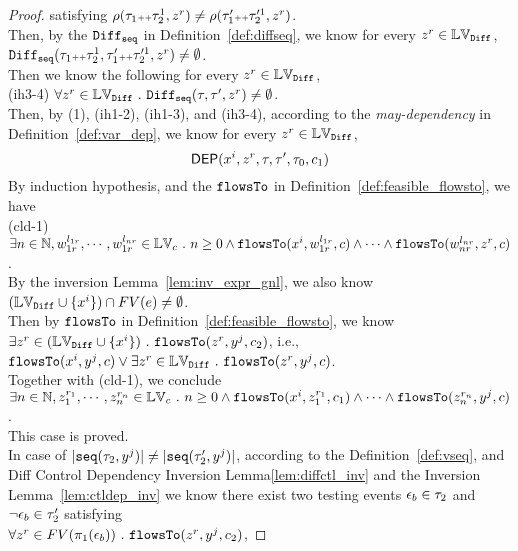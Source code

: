 \begin{proof}
satisfying $\rho(\mathtt{\tau}_1 {\scriptscriptstyle ++} \mathtt{\tau}_2^1, z^r) \neq \rho(\mathtt{\tau}_1'{\scriptscriptstyle ++} \mathtt{\tau}'^1_2, z^r) $.
\\
Then, by the $\mathtt{Diff}_{\mathtt{seq}}$ in Definition~\ref{def:diffseq}, we know for every $z^r \in \mathbb{LV}_{\mathtt{Diff}}$,
$\mathtt{Diff}_{\mathtt{seq}}(\mathtt{\tau}_1 {\scriptscriptstyle ++} \mathtt{\tau}_2^1, \mathtt{\tau}_1'{\scriptscriptstyle ++} \mathtt{\tau}'^1_2, z^r) \neq \emptyset$. 
\\
Then we know the following for every $z^r \in \mathbb{LV}_{\mathtt{Diff}}$,
\\
(ih3-4) $\forall z^r \in \mathbb{LV}_{\mathtt{Diff}} ~.~ \mathtt{Diff}_{\mathtt{seq}}(\mathtt{\tau}, \mathtt{\tau}', z^r) \neq \emptyset$.
\\
Then, by (1), (ih1-2), (ih1-3), and (ih3-4),  according to the \emph{may-dependency} in Definition~\ref{def:var_dep}, we know for every $z^r \in \mathbb{LV}_{\mathtt{Diff}}$,
\[
  \mathsf{DEP}(x^i, z^r, \mathtt{\tau}, \mathtt{\tau}', \mathtt{\tau}_0, c_1)
\]
By induction hypothesis, and the $\mathtt{flowsTo}$ in Definition~\ref{def:feasible_flowsto}, we have 
\\
(cld-1) 
$\exists n \in \mathbb{N}, w_{1r}^{l_{1r}}, \cdots, w_{1r}^{l_{nr}} \in \mathbb{LV}_{{c}} ~.~ n \geq 0 \land
\mathtt{flowsTo}(x^i,  w_{1r}^{l_{1r}}, c) 
\land \cdots \land \mathtt{flowsTo}(w_{nr}^{l_{nr}}, z^r, c)$.
\\
By the inversion Lemma~\ref{lem:inv_expr_gnl}, we also know 
$(\mathbb{LV}_{\mathtt{Diff}} \cup \{x^i\} )\cap FV(e) \neq \emptyset$.
\\
Then by $\mathtt{flowsTo}$ in Definition~\ref{def:feasible_flowsto}, 
we know 
$ \exists z^r \in (\mathbb{LV}_{\mathtt{Diff}} \cup \{x^i\} ) ~.~ \mathtt{flowsTo}(z^r, y^j, c_2)$, i.e., 
\\
$\mathtt{flowsTo}(x^i, y^j, c) \lor 
\exists z^r \in \mathbb{LV}_{\mathtt{Diff}} ~.~ \mathtt{flowsTo}(z^r, y^j, c)$.
\\
Together with (cld-1), we conclude 
\\
$\exists n \in \mathbb{N}, z_1^{r_1}, \cdots, z_n^{r_n} \in \mathbb{LV}_{{c}} ~.~ n \geq 0 \land
\mathtt{flowsTo}(x^i,  z_1^{r_1}, c_1) 
\land \cdots \land \mathtt{flowsTo}(z_n^{r_n}, y^j, c)$.
\\
This case is proved.
\\
In case of $|\mathtt{seq}(\mathtt{\tau}_2, y^j)| \neq |\mathtt{seq}(\mathtt{\tau}_2', y^j)|$,  according to the Definition~\ref{def:vseq},
and {Diff Control Dependency Inversion Lemma\ref{lem:diffctl_inv}} and the 
Inversion Lemma~\ref{lem:ctldep_inv} we know 
there exist two testing events $\mathtt{\epsilon}_b \in \mathtt{\tau}_2$ and $\neg\mathtt{\epsilon}_b \in \mathtt{\tau}_2'$ satisfying 
\\
$\forall z^r \in FV(\pi_1(\mathtt{\epsilon}_b)) ~.~ \mathtt{flowsTo}(z^r, y^j, c_2)$, 

\end{proof}
